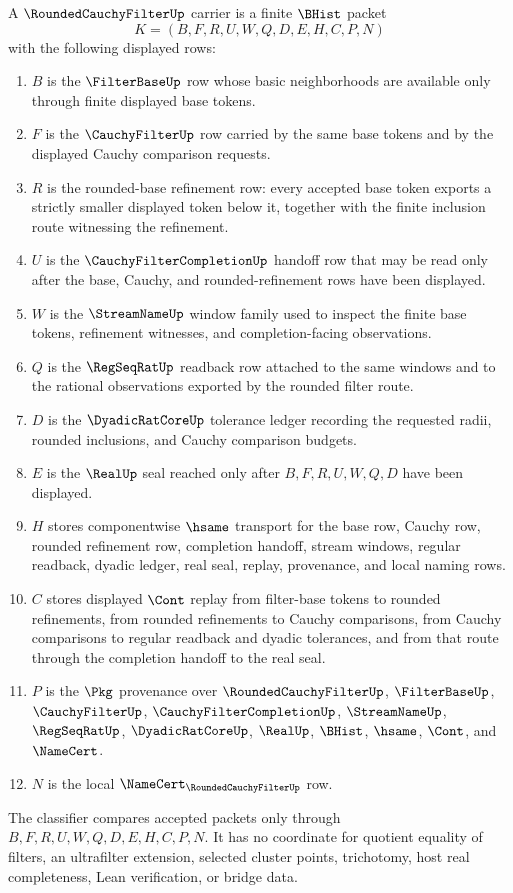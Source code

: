 \begin{definition}\label{def:rounded-cauchy-filter-carrier}
A $\RoundedCauchyFilterUp$ carrier is a finite $\BHist$ packet
$$
K=(B,F,R,U,W,Q,D,E,H,C,P,N)
$$
with the following displayed rows:
\begin{enumerate}
\item $B$ is the $\FilterBaseUp$ row whose basic neighborhoods are available only through finite displayed base tokens.
\item $F$ is the $\CauchyFilterUp$ row carried by the same base tokens and by the displayed Cauchy comparison requests.
\item $R$ is the rounded-base refinement row: every accepted base token exports a strictly smaller displayed token below it, together with the finite inclusion route witnessing the refinement.
\item $U$ is the $\CauchyFilterCompletionUp$ handoff row that may be read only after the base, Cauchy, and rounded-refinement rows have been displayed.
\item $W$ is the $\StreamNameUp$ window family used to inspect the finite base tokens, refinement witnesses, and completion-facing observations.
\item $Q$ is the $\RegSeqRatUp$ readback row attached to the same windows and to the rational observations exported by the rounded filter route.
\item $D$ is the $\DyadicRatCoreUp$ tolerance ledger recording the requested radii, rounded inclusions, and Cauchy comparison budgets.
\item $E$ is the $\RealUp$ seal reached only after $B,F,R,U,W,Q,D$ have been displayed.
\item $H$ stores componentwise $\hsame$ transport for the base row, Cauchy row, rounded refinement row, completion handoff, stream windows, regular readback, dyadic ledger, real seal, replay, provenance, and local naming rows.
\item $C$ stores displayed $\Cont$ replay from filter-base tokens to rounded refinements, from rounded refinements to Cauchy comparisons, from Cauchy comparisons to regular readback and dyadic tolerances, and from that route through the completion handoff to the real seal.
\item $P$ is the $\Pkg$ provenance over $\RoundedCauchyFilterUp$, $\FilterBaseUp$, $\CauchyFilterUp$, $\CauchyFilterCompletionUp$, $\StreamNameUp$, $\RegSeqRatUp$, $\DyadicRatCoreUp$, $\RealUp$, $\BHist$, $\hsame$, $\Cont$, and $\NameCert$.
\item $N$ is the local $\NameCert_{\RoundedCauchyFilterUp}$ row.
\end{enumerate}
The classifier compares accepted packets only through $B,F,R,U,W,Q,D,E,H,C,P,N$. It has no coordinate for quotient equality of filters, an ultrafilter extension, selected cluster points, trichotomy, host real completeness, Lean verification, or bridge data.
\end{definition}

